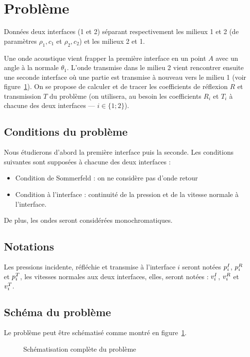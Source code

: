 \section{Problème}

Données deux interfaces (1 et 2) séparant respectivement les milieux 1 et 2 (de paramètres $\rho_1,c_1$ et $\rho_2,c_2$)
et les milieux 2 et 1.

Une onde acoustique vient frapper la première interface en un point $A$ avec un angle à la normale $\theta_1$. L'onde
transmise dans le milieu 2 vient rencontrer ensuite une seconde interface où une partie est transmise à nouveau vers le
milieu 1 (voir figure~\ref{complete}). On se propose de calculer et de tracer les coefficients de réflexion $R$ et
transmission $T$ du problème (on utilisera, au besoin les coefficients $R_i$ et $T_i$ à chacune des deux interfaces
--- $i\in\{1;2\}$).

\subsection{Conditions du problème}

Nous étudierons d'abord la première interface puis la seconde. Les conditions suivantes sont supposées à
chacune des deux interfaces :

\begin{itemize}
    \item Condition de Sommerfeld : on ne considère pas d'onde retour
    \item Condition à l'interface : continuité de la pression et de la vitesse normale à l'interface.
\end{itemize}

De plus, les ondes seront considérées monochromatiques.

\subsection{Notations}

Les pressions incidente, réfléchie et transmise à l'interface $i$ seront notées $p^I_i$, $p^R_i$ et $p^T_i$, les
vitesses normales aux deux interfaces, elles, seront notées : $v^I_i$, $v^R_i$ et $v^T_i$.

\subsection{Schéma du problème}

Le problème peut être schématisé comme montré en figure~\ref{complete}.

\begin{figure}[!b]
    \centering{}
    \caption{\label{complete} Schématisation complète du problème}
\end{figure}

